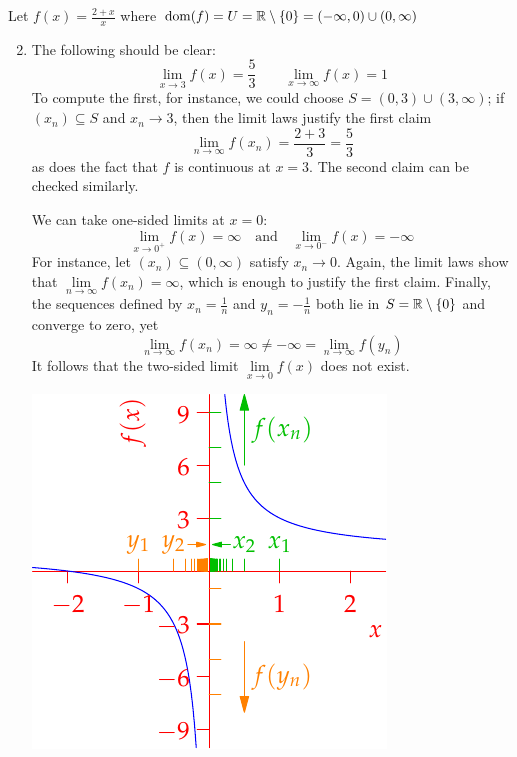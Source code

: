 \begin{examples}{}{}
	\exstart Let $f(x)=\frac{2+x}x$ where $\operatorname{dom}(f)=U=\mathbb{R}\setminus\{0\}=(-\infty,0)\cup(0,\infty)$
	\begin{enumerate}\setcounter{enumi}{1}
	  \item[]	The following should be clear:
		\[
			\lim\limits_{x\to 3}f(x)=\frac 53\qquad 
			\lim\limits_{x\to \infty}f(x)=1
		\]
		To compute the first, for instance, we could choose $S=(0,3)\cup(3,\infty)$; if $(x_n)\subseteq S$ and $x_n\to 3$, then the limit laws justify the first claim
		\[
			\lim_{n\to\infty}f(x_n)=\frac{2+3}{3}=\frac 53
		\]
		as does the fact that $f$ is continuous at $x=3$. The second claim can be checked similarly.\smallbreak
		\begin{minipage}[t]{0.6\linewidth}\vspace{0pt}
		We can take one-sided limits at $x=0$:
		\[
			\lim\limits_{x\to 0^+}f(x)=\infty
			\quad\text{and}\quad
			\lim\limits_{x\to 0^-}f(x)=-\infty
		\]
		For instance, let $(x_n)\subseteq (0,\infty)$ satisfy $x_n\to 0$. Again, the limit laws show that $\lim\limits_{n\to\infty}f(x_n)=\infty$, which is enough to justify the first claim.\medbreak
		Finally, the sequences defined by $x_n=\frac 1n$ and $y_n=-\frac 1n$ both lie in $S=\mathbb{R}\setminus\{0\}$ and converge to zero, yet
		\[
			\lim_{n\to\infty} f(x_n)=\infty
			\neq -\infty =\lim_{n\to\infty} f(y_n)
		\]
		It follows that the two-sided limit $\displaystyle\lim\limits_{x\to 0}f(x)$ does not exist.
	\end{minipage}
	\hfill
	\begin{minipage}[t]{0.39\linewidth}\vspace{0pt}
		\flushright\includegraphics{limitex2}
	\end{minipage}
		

\end{enumerate}
\end{examples}

